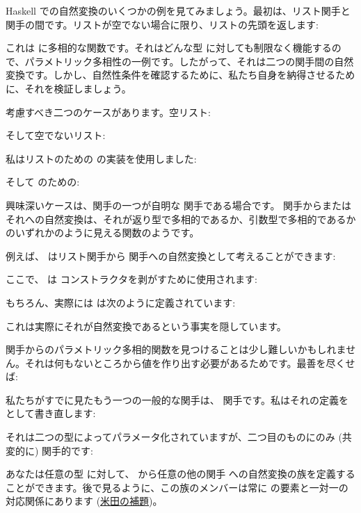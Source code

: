 Haskell での自然変換のいくつかの例を見てみましょう。最初は、リスト関手と  関手の間です。リストが空でない場合に限り、リストの先頭を返します: 

これは  に多相的な関数です。それはどんな型  に対しても制限なく機能するので、パラメトリック多相性の一例です。したがって、それは二つの関手間の自然変換です。しかし、自然性条件を確認するために、私たち自身を納得させるために、それを検証しましょう。

考慮すべき二つのケースがあります。空リスト: 


そして空でないリスト: 


私はリストのための  の実装を使用しました: 

そして  のための: 

興味深いケースは、関手の一つが自明な  関手である場合です。  関手からまたはそれへの自然変換は、それが返り型で多相的であるか、引数型で多相的であるかのいずれかのように見える関数のようです。

例えば、 はリスト関手から  関手への自然変換として考えることができます: 

ここで、 は  コンストラクタを剥がすために使用されます: 

もちろん、実際には  は次のように定義されています: 

これは実際にそれが自然変換であるという事実を隠しています。

 関手からのパラメトリック多相的関数を見つけることは少し難しいかもしれません。それは何もないところから値を作り出す必要があるためです。最善を尽くせば: 

私たちがすでに見たもう一つの一般的な関手は、 関手です。私はそれの定義をとして書き直します: 

それは二つの型によってパラメータ化されていますが、二つ目のものにのみ (共変的に) 関手的です: 

あなたは任意の型  に対して、 から任意の他の関手  への自然変換の族を定義することができます。後で見るように、この族のメンバーは常に  の要素と一対一の対応関係にあります (\hyperref[the-yoneda-lemma]{米田の補題})。

